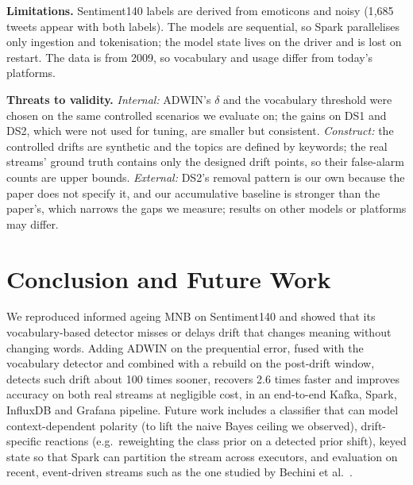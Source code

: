 \documentclass[conference]{IEEEtran}
\begin{document}
\textbf{Limitations.} Sentiment140 labels are derived from emoticons and noisy (1{,}685 tweets
appear with both labels). The models are sequential, so Spark parallelises only ingestion and
tokenisation; the model state lives on the driver and is lost on restart. The data is from 2009,
so vocabulary and usage differ from today's platforms.

\textbf{Threats to validity.} \emph{Internal:} ADWIN's $\delta$ and the vocabulary threshold were
chosen on the same controlled scenarios we evaluate on; the gains on DS1 and DS2, which were not
used for tuning, are smaller but consistent. \emph{Construct:} the controlled drifts are
synthetic and the topics are defined by keywords; the real streams' ground truth contains only
the designed drift points, so their false-alarm counts are upper bounds. \emph{External:} DS2's
removal pattern is our own because the paper does not specify it, and our accumulative baseline
is stronger than the paper's, which narrows the gaps we measure; results on other models or
platforms may differ.

\section{Conclusion and Future Work}
We reproduced informed ageing MNB on Sentiment140 and showed that its vocabulary-based detector
misses or delays drift that changes meaning without changing words. Adding ADWIN on the
prequential error, fused with the vocabulary detector and combined with a rebuild on the
post-drift window, detects such drift about 100 times sooner, recovers 2.6 times faster and
improves accuracy on both real streams at negligible cost, in an end-to-end Kafka, Spark,
InfluxDB and Grafana pipeline. Future work includes a classifier that can model
context-dependent polarity (to lift the naive Bayes ceiling we observed), drift-specific
reactions (e.g.\ reweighting the class prior on a detected prior shift), keyed state so that
Spark can partition the stream across executors, and evaluation on recent, event-driven streams
such as the one studied by Bechini et al.~\cite{bechini2021}.



\end{document}
